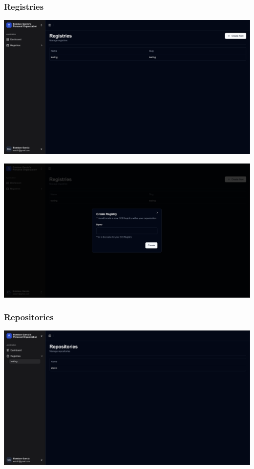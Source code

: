 \documentclass{article}
\begin{document}
  \subsubsection{Registries}

  \includegraphics[scale=0.28]{screenshots/registries.png}

  \includegraphics[scale=0.28]{screenshots/create-registry.png}

  \subsubsection{Repositories}

  \includegraphics[scale=0.28]{screenshots/repositories.png}
\end{document}
